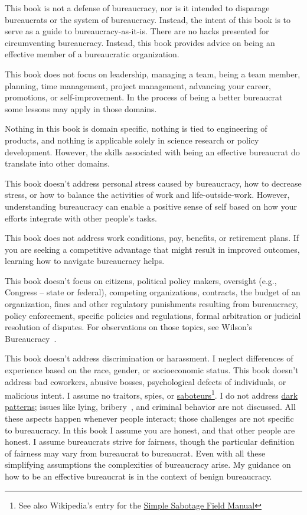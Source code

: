 This book is not a defense of bureaucracy, nor is it intended to disparage bureaucrats or the system of bureaucracy. Instead, the intent of this book is to serve as a guide to bureaucracy-as-it-is. There are no hacks presented for circumventing bureaucracy. Instead, this book provides advice on being an effective member of a bureaucratic organization.

This book does not focus on leadership, managing a team, being a team member, planning, time management, project management, advancing your career, promotions, or self-improvement. In the process of being a better bureaucrat some lessons may apply in those domains.


Nothing in this book is domain specific, nothing is tied to engineering of products, and nothing is applicable solely in science research or policy development. However, the skills associated with being an effective bureaucrat do translate into other domains.

This book doesn't address personal stress caused by bureaucracy, how to decrease stress, or how to balance the activities of work and life-outside-work.   However, understanding bureaucracy can enable a positive sense of self based on how your efforts integrate with other people's tasks. 

This book does not address work conditions, pay, benefits, or retirement plans. If you are seeking a competitive advantage that might result in improved outcomes, learning how to navigate bureaucracy helps.


This book doesn't focus on citizens, political policy makers, oversight (e.g., Congress -- state or federal), competing organizations, contracts, the budget of an organization, fines and other regulatory punishments resulting from bureaucracy, policy enforcement, specific policies and regulations, formal arbitration or judicial resolution of disputes. For observations on those topics, see Wilson's Bureaucracy~\cite{1991_Wilson}. 


This book doesn't address discrimination or harassment. I neglect differences of experience based on the race, gender, or socioeconomic status. This book doesn't address bad coworkers, abusive bosses, psychological defects of individuals, or malicious intent. I assume no traitors, spies, or \href{https://www.hsdl.org/?abstract&did=750070}{saboteurs}\footnote{See also Wikipedia's entry for the \href{https://en.wikisource.org/wiki/Simple_Sabotage_Field_Manual}{Simple Sabotage Field Manual}}.
I do not address \href{https://en.wikipedia.org/wiki/Dark_pattern}{dark patterns}; issues like lying, bribery~\cite{2021_Ang}, and criminal behavior are not discussed. All these aspects happen whenever people interact; those challenges are not specific to bureaucracy. In this book I assume you are honest, and that other people are honest.  
I assume bureaucrats strive for fairness, though the particular definition of fairness may vary from bureaucrat to bureaucrat. 
Even with all these simplifying assumptions the complexities of bureaucracy arise. My guidance on how to be an effective bureaucrat is in the context of benign bureaucracy.


